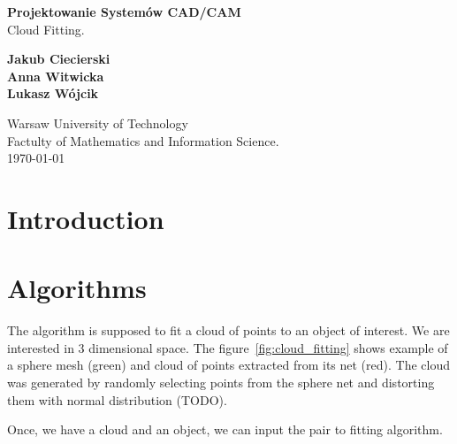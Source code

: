 \documentclass{book}
\author{Jakub Ciecierski}
\date{\today}
\begin{document}
\begin{titlepage}
    \begin{center}

            \textbf{\Huge Projektowanie Systemów CAD/CAM} \\ {\huge Cloud Fitting.} \\ [0.5cm]

            \vspace*{\fill}

            \textbf{\large Jakub Ciecierski \\ Anna Witwicka \\ Lukasz Wójcik}

            \vspace*{\fill}
            
            \textnormal{\large Warsaw University of Technology \\ Factulty of Mathematics and Information Science. \\ \today}

    \end{center}
\end{titlepage}

\tableofcontents


\chapter*{Introduction}

\chapter{Algorithms}

The algorithm is supposed to fit a cloud of points to an object of interest. We are interested in 3 dimensional space.
The figure~\ref{fig:cloud_fitting} shows example of a sphere mesh (green) and cloud of points extracted from its net (red). The cloud was generated by randomly selecting points from the sphere net and distorting them with normal distribution (TODO).

Once, we have a cloud and an object, we can input the pair to fitting algorithm.
\end{document}
